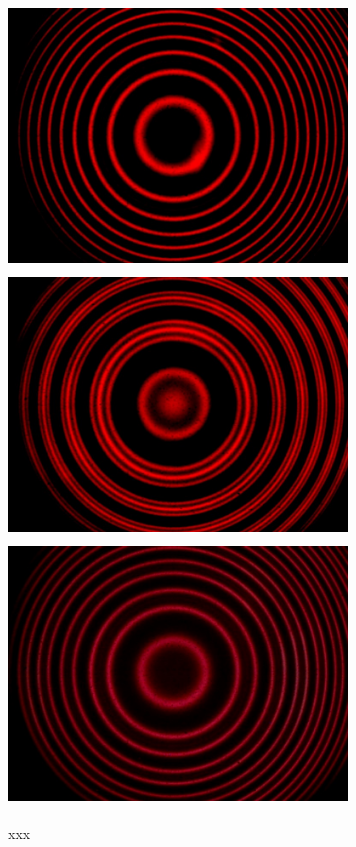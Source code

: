 \documentclass[fleqn]{article}
\begin{document}
  \begin{figure}[h!]
    \includegraphics[height=7cm, width=9cm]{Second.jpg}
    \includegraphics[height=7cm, width=9cm]{First.jpg}
    \includegraphics[height=7cm, width=9cm]{Third.jpg}
    \caption{xxx}
  \end{figure}

  \pagebreak
\end{document}
